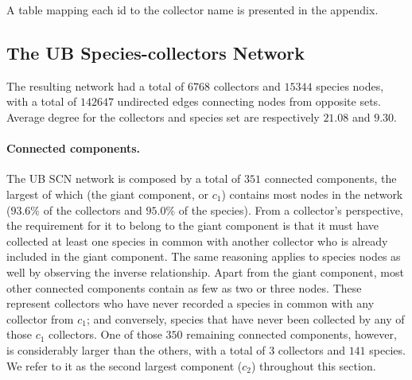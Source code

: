 A table mapping each id to the collector name is presented in the appendix.



\subsection{The UB Species-collectors Network} \label{section:ub_scn}

The resulting network had a total of $6768$ collectors and $15344$ species nodes, with a total of $142647$ undirected edges connecting nodes from opposite sets. 
Average degree for the collectors and species set are respectively $21.08$ and $9.30$.

\paragraph*{Connected components.}
The UB SCN network is composed by a total of $351$ connected components, the largest of which (the giant component, or $c_1$) contains most nodes in the network ($93.6\%$ of the collectors and $95.0\%$ of the species). 
From a collector's perspective, the requirement for it to belong to the giant component is that it must have collected at least one species in common with another collector who is already included in the giant component. The same reasoning applies to species nodes as well by observing the inverse relationship.
Apart from the giant component, most other connected components contain as few as two or three nodes. These represent collectors who have never recorded a species in common with any collector from $c_1$; and conversely, species that have never been collected by any of those $c_1$ collectors.
One of those $350$ remaining connected components, however, is considerably larger than the others, with a total of $3$ collectors and $141$ species. We refer to it as the second largest component ($c_2$) throughout this section.

